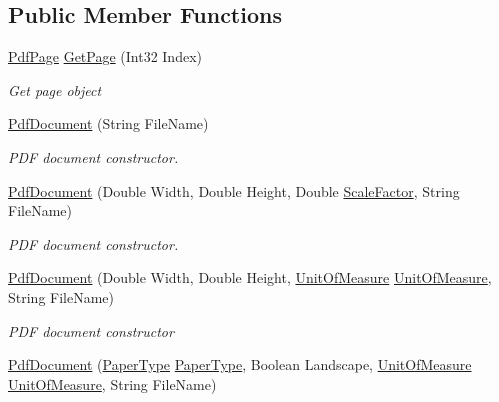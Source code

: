 \subsection*{Public Member Functions}
\begin{DoxyCompactItemize}
\item 
\hyperlink{class_pdf_file_writer_1_1_pdf_page}{Pdf\+Page} \hyperlink{class_pdf_file_writer_1_1_pdf_document_a49a919755dfd0f3c5f7c04af53d746f3}{Get\+Page} (Int32 Index)
\begin{DoxyCompactList}\small\item\em Get page object \end{DoxyCompactList}\item 
\hyperlink{class_pdf_file_writer_1_1_pdf_document_a30078b46ab9694faa5021390639f0ac3}{Pdf\+Document} (String File\+Name)
\begin{DoxyCompactList}\small\item\em P\+DF document constructor. \end{DoxyCompactList}\item 
\hyperlink{class_pdf_file_writer_1_1_pdf_document_a88a72e0943271128dee51532d4080d06}{Pdf\+Document} (Double Width, Double Height, Double \hyperlink{class_pdf_file_writer_1_1_pdf_document_a978123b82efb2713ddfb4a44e4f428cc}{Scale\+Factor}, String File\+Name)
\begin{DoxyCompactList}\small\item\em P\+DF document constructor. \end{DoxyCompactList}\item 
\hyperlink{class_pdf_file_writer_1_1_pdf_document_a67ce07d8db917e3fcf73e4101fc305cf}{Pdf\+Document} (Double Width, Double Height, \hyperlink{namespace_pdf_file_writer_a07c9a86b1844a70efb1eb148377dde65}{Unit\+Of\+Measure} \hyperlink{namespace_pdf_file_writer_a07c9a86b1844a70efb1eb148377dde65}{Unit\+Of\+Measure}, String File\+Name)
\begin{DoxyCompactList}\small\item\em P\+DF document constructor \end{DoxyCompactList}\item 
\hyperlink{class_pdf_file_writer_1_1_pdf_document_a7579a52642cbc34fa289c5b6633723e8}{Pdf\+Document} (\hyperlink{namespace_pdf_file_writer_a75284a02a7aac96778d2e1f95f406dfb}{Paper\+Type} \hyperlink{namespace_pdf_file_writer_a75284a02a7aac96778d2e1f95f406dfb}{Paper\+Type}, Boolean Landscape, \hyperlink{namespace_pdf_file_writer_a07c9a86b1844a70efb1eb148377dde65}{Unit\+Of\+Measure} \hyperlink{namespace_pdf_file_writer_a07c9a86b1844a70efb1eb148377dde65}{Unit\+Of\+Measure}, String File\+Name)

\end{DoxyCompactItemize}
